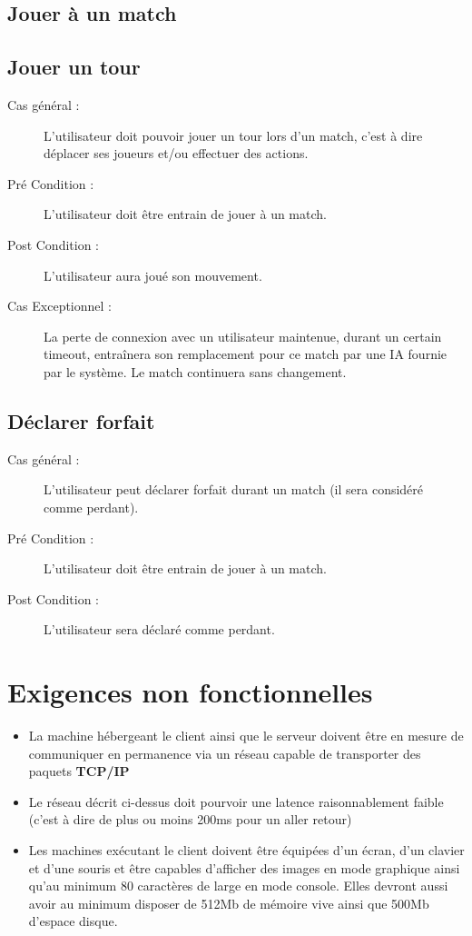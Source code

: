 \documentclass[a4paper]{report}
\begin{document}
\subsection{Jouer à un match}
\subsection{Jouer un tour}
\begin{description}
    \item[Cas général :] L'\gls{utilisateur} doit pouvoir jouer un tour lors d'un match, c'est à dire déplacer ses \glspl{joueur} et/ou effectuer des actions.
    \item[Pré Condition  :] L'\gls{utilisateur} doit être entrain de jouer à un match.
    \item[Post Condition :] L'\gls{utilisateur} aura joué son mouvement.
    \item[Cas Exceptionnel :] La perte de connexion avec un \gls{utilisateur} maintenue, durant un certain timeout, entraînera son remplacement pour ce match par une IA fournie par le système. Le match continuera sans changement.
\end{description}
\subsection{Déclarer forfait}
\begin{description}
    \item[Cas général :] L'\gls{utilisateur} peut déclarer forfait durant un match (il sera considéré comme perdant).
    \item[Pré Condition  :] L'\gls{utilisateur} doit être entrain de jouer à un match.
    \item[Post Condition :] L'\gls{utilisateur} sera déclaré comme perdant.
\end{description}


\section{Exigences non fonctionnelles}
\begin{itemize}
    \item La machine hébergeant le \gls{client} ainsi que le \gls{serveur} doivent être en mesure de communiquer en permanence via un réseau capable de transporter des paquets \textbf{TCP/IP}
    \item Le réseau décrit ci-dessus doit pourvoir une latence raisonnablement faible (c'est à dire de plus ou moins 200ms pour un aller retour)
    \item Les machines exécutant le \gls{client} doivent être équipées d'un écran, d'un clavier et d'une souris et être capables d'afficher des images en mode graphique ainsi qu'au minimum 80 caractères de large en mode console. Elles devront aussi avoir au minimum disposer de 512Mb de mémoire vive ainsi que 500Mb d'espace disque.
\end{itemize}
\end{document}
